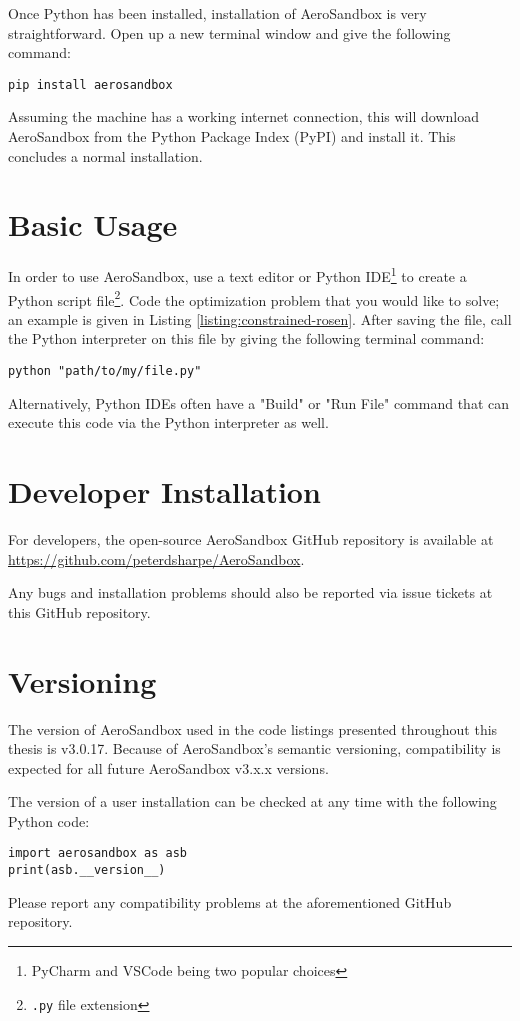 Once Python has been installed, installation of AeroSandbox is very straightforward. Open up a new terminal window and give the following command:
\begin{verbatim}
pip install aerosandbox
\end{verbatim}

Assuming the machine has a working internet connection, this will download AeroSandbox from the Python Package Index (PyPI) and install it. This concludes a normal installation.


\section{Basic Usage}

In order to use AeroSandbox, use a text editor or Python IDE\footnote{PyCharm and VSCode being two popular choices} to create a Python script file\footnote{\texttt{.py} file extension}. Code the optimization problem that you would like to solve; an example is given in Listing \ref{listing:constrained-rosen}. After saving the file, call the Python interpreter on this file by giving the following terminal command:
\begin{verbatim}
python "path/to/my/file.py"
\end{verbatim}

Alternatively, Python IDEs often have a "Build" or "Run File" command that can execute this code via the Python interpreter as well.


\section{Developer Installation}

For developers, the open-source AeroSandbox GitHub repository is available at \url{https://github.com/peterdsharpe/AeroSandbox}.

Any bugs and installation problems should also be reported via issue tickets at this GitHub repository.


\section{Versioning}

The version of AeroSandbox used in the code listings presented throughout this thesis is v3.0.17. Because of AeroSandbox's semantic versioning, compatibility is expected for all future AeroSandbox v3.x.x versions.

The version of a user installation can be checked at any time with the following Python code:

\begin{verbatim}
import aerosandbox as asb
print(asb.__version__)
\end{verbatim}

Please report any compatibility problems at the aforementioned GitHub repository.